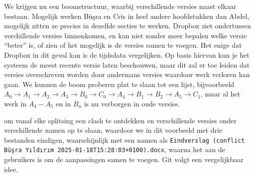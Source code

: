 We krijgen nu een boomstructuur, waarbij verschillende versies naast elkaar bestaan. Mogelijk werken B\"u\c sra en Cris in heel andere hoofdstukken dan Abdel, mogelijk zitten ze precies in dezelfde secties te werken. Dropbox ziet ondertussen verchillende versies binnenkomen, en kan niet zonder meer bepalen welke versie \enquote{beter} is, of zien of het mogelijk is de versies samen te voegen. Het enige dat Dropbox in dit geval kan is de tijdsdata vergelijken. Op basis hiervan kun je het systeem de meest recente versie laten beschouwen, maar dit zal er toe leiden dat versies overschreven worden door andermans versies waardoor werk verloren kan gaan. We kunnen de boom proberen plat te slaan tot een lijst, bijvoorbeeld $A_0 \to A_1 \to A_2 \to A_3 \to B_0 \to C_0 \to A_4 \to B_1 \to B_2 \to A_5 \to C_1$, maar al het werk in $A_4-A_5$ en in $B_n$ is nu verborgen in oude versies. 

 om vanaf elke splitsing een clash te ontdekken en verschillende versies onder verschillende namen op te slaan, waardoor we in dit voorbeeld met drie bestanden eindigen, waarschijnlijk met een namen als \texttt{Eindverslag (conflict B\"u\c sra Y\i ld\i r\i m 2025-01-18T15:28:03+0100).docx}, waarna het aan de gebruikers is om de aanpassingen samen te voegen. Git volgt een vergelijkbaar idee.\\[15mm]

